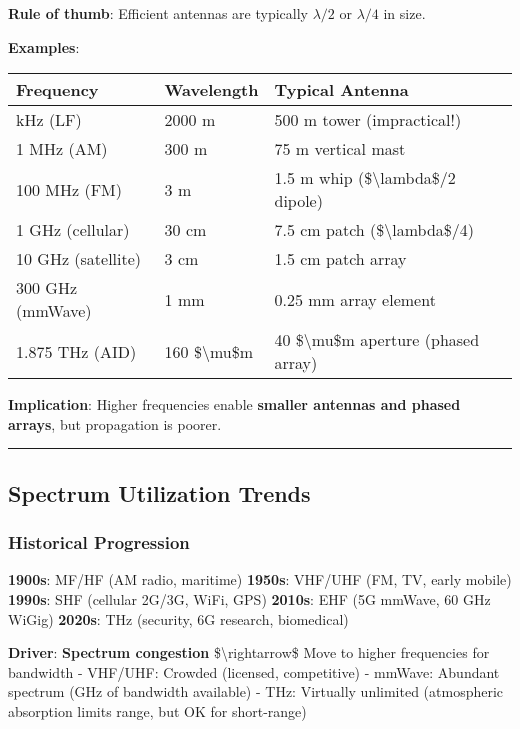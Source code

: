 \textbf{Rule of thumb}: Efficient antennas are typically \(\lambda/2\)
or \(\lambda/4\) in size.

\textbf{Examples}:

{\def\LTcaptype{} %
\begin{longtable}[]{@{}lll@{}}
\toprule\noalign{}
Frequency & Wavelength & Typical Antenna \\
\midrule\noalign{}
\endhead
\bottomrule\noalign{}
\endlastfoot
150 kHz (LF) & 2000 m & 500 m tower (impractical!) \\
1 MHz (AM) & 300 m & 75 m vertical mast \\
100 MHz (FM) & 3 m & 1.5 m whip (\$\textbackslash lambda\$/2 dipole) \\
1 GHz (cellular) & 30 cm & 7.5 cm patch (\$\textbackslash lambda\$/4) \\
10 GHz (satellite) & 3 cm & 1.5 cm patch array \\
300 GHz (mmWave) & 1 mm & 0.25 mm array element \\
1.875 THz (AID) & 160 \$\textbackslash mu\$m & 40 \$\textbackslash mu\$m
aperture (phased array) \\
\end{longtable}
}

\textbf{Implication}: Higher frequencies enable \textbf{smaller antennas
and phased arrays}, but propagation is poorer.

\begin{center}\rule{0.5\linewidth}{0.5pt}\end{center}

\subsection{Spectrum Utilization
Trends}\label{spectrum-utilization-trends}

\subsubsection{Historical Progression}\label{historical-progression}

\textbf{1900s}: MF/HF (AM radio, maritime) \textbf{1950s}: VHF/UHF (FM,
TV, early mobile) \textbf{1990s}: SHF (cellular 2G/3G, WiFi, GPS)
\textbf{2010s}: EHF (5G mmWave, 60 GHz WiGig) \textbf{2020s}: THz
(security, 6G research, biomedical)

\textbf{Driver}: \textbf{Spectrum congestion}
\$\textbackslash rightarrow\$ Move to higher frequencies for bandwidth -
VHF/UHF: Crowded (licensed, competitive) - mmWave: Abundant spectrum
(GHz of bandwidth available) - THz: Virtually unlimited (atmospheric
absorption limits range, but OK for short-range)

